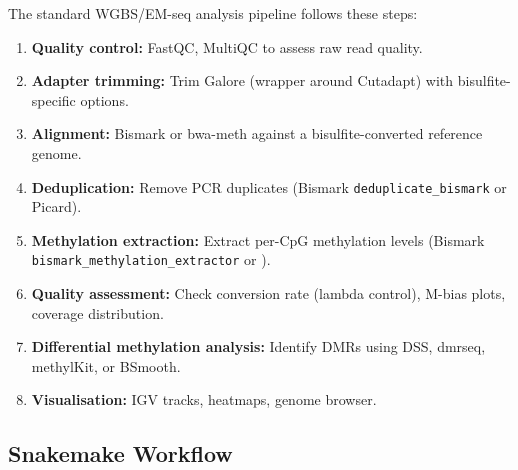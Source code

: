 The standard WGBS/EM-seq analysis pipeline follows these steps:

\begin{enumerate}[itemsep=2pt]
  \item \textbf{Quality control:} FastQC, MultiQC to assess raw read quality.
  \item \textbf{Adapter trimming:} Trim Galore (wrapper around Cutadapt) with bisulfite-specific options.
  \item \textbf{Alignment:} Bismark or bwa-meth against a bisulfite-converted reference genome.
  \item \textbf{Deduplication:} Remove PCR duplicates (Bismark \texttt{deduplicate\_bismark} or Picard).
  \item \textbf{Methylation extraction:} Extract per-CpG methylation levels (Bismark \texttt{bismark\_methylation\_extractor} or ).
  \item \textbf{Quality assessment:} Check conversion rate (lambda control), M-bias plots, coverage distribution.
  \item \textbf{Differential methylation analysis:} Identify DMRs using DSS, dmrseq, methylKit, or BSmooth.
  \item \textbf{Visualisation:} IGV tracks, heatmaps, genome browser.
\end{enumerate}

\subsection{Snakemake Workflow}
\label{subsec:methylation:snakemake}

